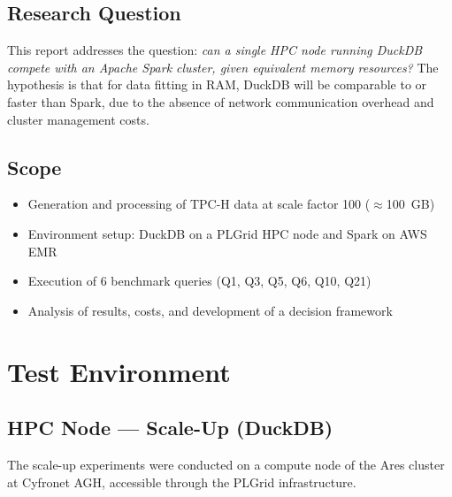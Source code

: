 \documentclass[12pt,a4paper]{article}
\begin{document}
\subsection{Research Question}

This report addresses the question: \textit{can a single HPC node running DuckDB
compete with an Apache Spark cluster, given equivalent memory resources?} The
hypothesis is that for data fitting in RAM, DuckDB will be comparable to or faster
than Spark, due to the absence of network communication overhead and cluster
management costs.

\subsection{Scope}

\begin{itemize}
  \item Generation and processing of TPC-H data at scale factor 100 ($\approx$100~GB)
  \item Environment setup: DuckDB on a PLGrid HPC node and Spark on AWS EMR
  \item Execution of 6 benchmark queries (Q1, Q3, Q5, Q6, Q10, Q21)
  \item Analysis of results, costs, and development of a decision framework
\end{itemize}

\section{Test Environment}

\subsection{HPC Node --- Scale-Up (DuckDB)}

The scale-up experiments were conducted on a compute node of the Ares cluster at
Cyfronet AGH, accessible through the PLGrid infrastructure.
\end{document}
